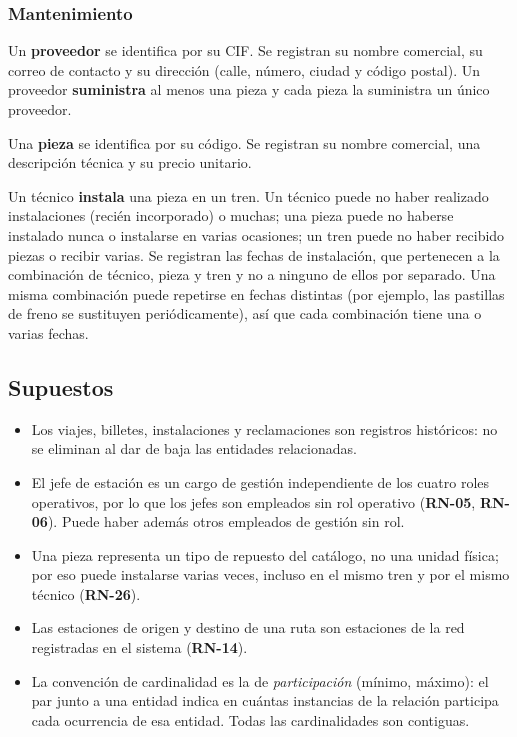 \documentclass[11pt,a4paper]{article}
\DeclareRobustCommand{\_}{\textunderscore\allowbreak}
\newcommand{\RN}[1]{\textbf{RN-#1}}
\begin{document}
\subsubsection*{Mantenimiento}
\begin{description}[leftmargin=1.4cm,style=nextline]
\item[\RN{24}] Un \textbf{proveedor} se identifica por su CIF. Se registran su nombre comercial, su correo de contacto y su dirección (calle, número, ciudad y código postal). Un proveedor \textbf{suministra} al menos una pieza y cada pieza la suministra un único proveedor.
\item[\RN{25}] Una \textbf{pieza} se identifica por su código. Se registran su nombre comercial, una descripción técnica y su precio unitario.
\item[\RN{26}] Un técnico \textbf{instala} una pieza en un tren. Un técnico puede no haber realizado instalaciones (recién incorporado) o muchas; una pieza puede no haberse instalado nunca o instalarse en varias ocasiones; un tren puede no haber recibido piezas o recibir varias. Se registran las fechas de instalación, que pertenecen a la combinación de técnico, pieza y tren y no a ninguno de ellos por separado. Una misma combinación puede repetirse en fechas distintas (por ejemplo, las pastillas de freno se sustituyen periódicamente), así que cada combinación tiene una o varias fechas.
\end{description}

\subsection{Supuestos}
\begin{itemize}
\item Los viajes, billetes, instalaciones y reclamaciones son registros históricos: no se eliminan al dar de baja las entidades relacionadas.
\item El jefe de estación es un cargo de gestión independiente de los cuatro roles operativos, por lo que los jefes son empleados sin rol operativo (\RN{05}, \RN{06}). Puede haber además otros empleados de gestión sin rol.
\item Una pieza representa un tipo de repuesto del catálogo, no una unidad física; por eso puede instalarse varias veces, incluso en el mismo tren y por el mismo técnico (\RN{26}).
\item Las estaciones de origen y destino de una ruta son estaciones de la red registradas en el sistema (\RN{14}).
\item La convención de cardinalidad es la de \emph{participación} (mínimo, máximo): el par junto a una entidad indica en cuántas instancias de la relación participa cada ocurrencia de esa entidad. Todas las cardinalidades son contiguas.
\end{itemize}
\end{document}
